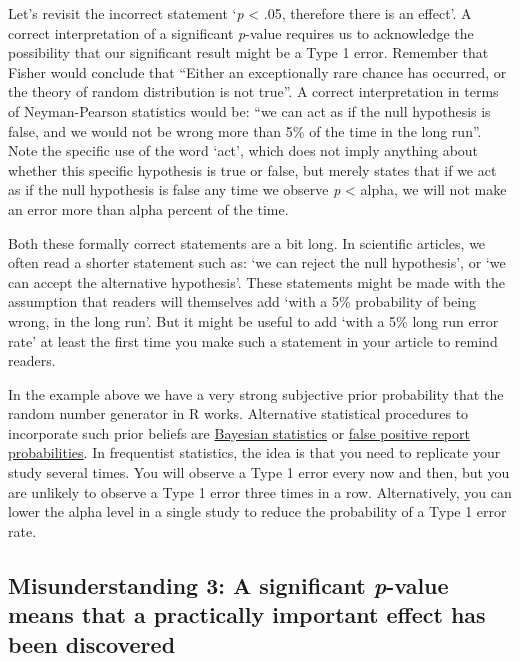 \documentclass[
  oneside]{book}
\begin{document}
Let's revisit the incorrect statement `\emph{p} \textless{} .05, therefore there is an effect'. A correct interpretation of a significant \emph{p}-value requires us to acknowledge the possibility that our significant result might be a Type 1 error. Remember that Fisher would conclude that ``Either an exceptionally rare chance has occurred, or the theory of random distribution is not true''. A correct interpretation in terms of Neyman-Pearson statistics would be: ``we can act as if the null hypothesis is false, and we would not be wrong more than 5\% of the time in the long run''. Note the specific use of the word `act', which does not imply anything about whether this specific hypothesis is true or false, but merely states that if we act as if the null hypothesis is false any time we observe \emph{p} \textless{} alpha, we will not make an error more than alpha percent of the time.

Both these formally correct statements are a bit long. In scientific articles, we often read a shorter statement such as: `we can reject the null hypothesis', or `we can accept the alternative hypothesis'. These statements might be made with the assumption that readers will themselves add `with a 5\% probability of being wrong, in the long run'. But it might be useful to add `with a 5\% long run error rate' at least the first time you make such a statement in your article to remind readers.

In the example above we have a very strong subjective prior probability that the random number generator in R works. Alternative statistical procedures to incorporate such prior beliefs are \protect\hyperlink{bayes}{Bayesian statistics} or \protect\hyperlink{ppv}{false positive report probabilities}. In frequentist statistics, the idea is that you need to replicate your study several times. You will observe a Type 1 error every now and then, but you are unlikely to observe a Type 1 error three times in a row. Alternatively, you can lower the alpha level in a single study to reduce the probability of a Type 1 error rate.

\hypertarget{misunderstanding-3-a-significant-p-value-means-that-a-practically-important-effect-has-been-discovered}{%
\subsection{\texorpdfstring{Misunderstanding 3: A significant \emph{p}-value means that a practically important effect has been discovered}{Misunderstanding 3: A significant p-value means that a practically important effect has been discovered}}\label{misunderstanding-3-a-significant-p-value-means-that-a-practically-important-effect-has-been-discovered}}
\end{document}
